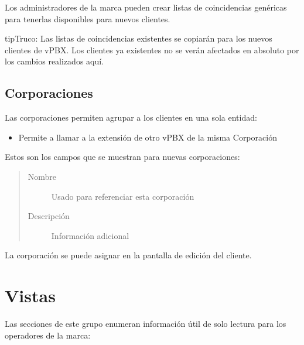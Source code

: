 \documentclass[letterpaper,10pt,spanish]{sphinxmanual}
\begin{document}
Los administradores de la marca pueden crear listas de coincidencias genéricas para tenerlas disponibles para nuevos clientes.

\begin{notice}{tip}{Truco:}
Las listas de coincidencias existentes se copiarán para los nuevos clientes de vPBX. Los clientes ya existentes no se verán afectados en absoluto por los cambios realizados aquí.
\end{notice}


\subsection{Corporaciones}
\label{administration_portal/brand/settings/corporations:corporations}\label{administration_portal/brand/settings/corporations::doc}\label{administration_portal/brand/settings/corporations:id1}
Las corporaciones permiten agrupar a los clientes en una sola entidad:
\begin{itemize}
\item {} 
Permite a {\hyperref[administration_portal/client/vpbx/routing_endpoints/friends/internal_friends:internal\string-friends]{}} llamar a la extensión de otro vPBX de la misma Corporación

\end{itemize}

Estos son los campos que se muestran para nuevas corporaciones:
\begin{quote}
\begin{description}
\item[{Nombre}] \leavevmode
Usado para referenciar esta corporación

\item[{Descripción}] \leavevmode
Información adicional

\end{description}
\end{quote}

La corporación se puede asignar en la pantalla de edición del cliente.


\section{Vistas}
\label{administration_portal/brand/views/index::doc}\label{administration_portal/brand/views/index:views}
Las secciones de este grupo enumeran información útil de solo lectura para los operadores de la marca:
\end{document}
